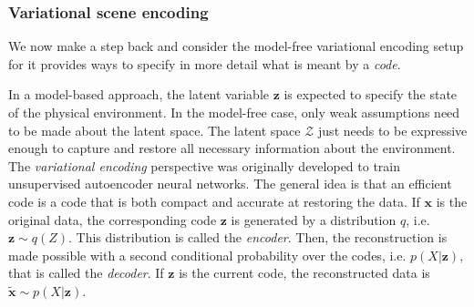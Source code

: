 \documentclass[12pt,twoside,openright]{article}
\begin{document}






\subsubsection{Variational scene encoding}

We now make a step back and consider the model-free variational encoding setup for it provides ways to specify in more detail what is meant by a \emph{code}.

In a model-based approach, the latent variable $\boldsymbol{z}$ is expected to specify the state of the physical environment. In the model-free case, only weak assumptions need to be made about the latent space.  The latent space $\mathcal{Z}$ just needs to be expressive enough to capture and restore all necessary information about the environment.  
The \emph{variational encoding} perspective \cite{hinton1994autoencoders} was originally developed 
to train unsupervised autoencoder neural networks. The general idea is that an efficient code 
is a code that is both compact and accurate at restoring the data. 
If $\boldsymbol{x}$ is the original data, the corresponding code $\boldsymbol{z}$ is generated by a distribution $q$, i.e. $\boldsymbol{z} \sim q(Z)$. This distribution is called the \emph{encoder}. Then, the reconstruction is made possible with a second conditional probability over the codes, i.e. $p(X|\boldsymbol{z})$, that is called the \emph{decoder}. If $\boldsymbol{z}$ is the current code, the reconstructed data is $\tilde{\boldsymbol{x}} \sim p(X|\boldsymbol{z})$. 
\end{document}

